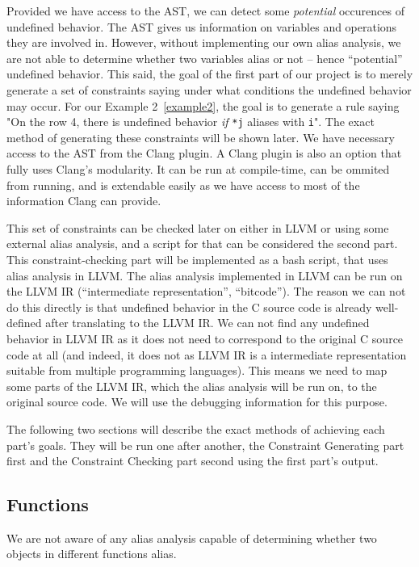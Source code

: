 Provided we have access to the AST, we can detect some \emph{potential} occurences of undefined behavior. The AST gives us information on variables and operations they are involved in. However, without implementing our own alias analysis, we are not able to determine whether two variables alias or not -- hence ``potential'' undefined behavior. This said, the goal of the first part of our project is to merely generate a set of constraints saying under what conditions the undefined behavior may occur. For our Example 2~\ref{example2}, the goal is to generate a rule saying "On the row 4, there is undefined behavior \emph{if} \verb|*j| aliases with \verb|i|". The exact method of generating these constraints will be shown later. We have necessary access to the AST from the Clang plugin. A Clang plugin is also an option that fully uses Clang's modularity. It can be run at compile-time, can be ommited from running, and is extendable easily as we have access to most of the information Clang can provide.

This set of constraints can be checked later on either in LLVM or using some external alias analysis, and a script for that can be considered the second part. This constraint-checking part will be implemented as a bash script, that uses alias analysis in LLVM. The alias analysis implemented in LLVM can be run on the LLVM IR (``intermediate representation'', ``bitcode''). The reason we can not do this directly is that undefined behavior in the C source code is already well-defined after translating to the LLVM IR. We can not find any undefined behavior in LLVM IR as it does not need to correspond to the original C source code at all (and indeed, it does not as LLVM IR is a intermediate representation suitable from multiple programming languages). This means we need to map some parts of the LLVM IR, which the alias analysis will be run on, to the original source code. We will use the debugging information for this purpose.

The following two sections will describe the exact methods of achieving each part's goals. They will be run one after another, the Constraint Generating part first and the Constraint Checking part second using the first part's output.


\subsection{Functions}
We are not aware of any alias analysis capable of determining whether two objects in different functions alias.

